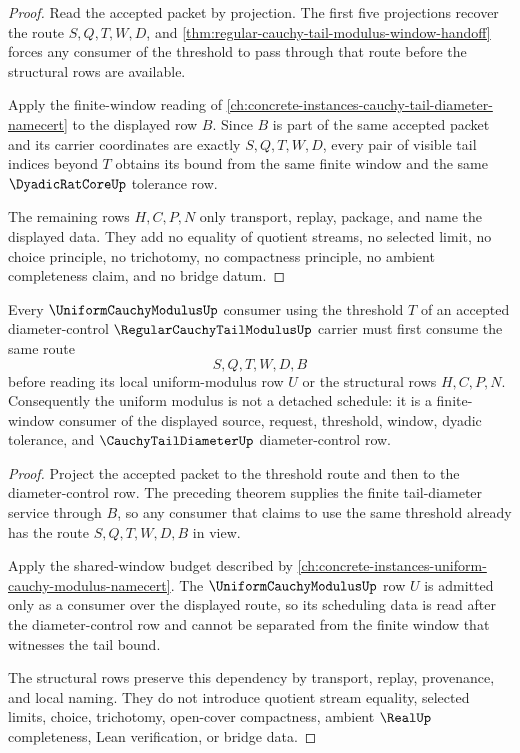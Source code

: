 \begin{proof}
Read the accepted packet by projection. The first five projections recover the route $S,Q,T,W,D$, and \autoref{thm:regular-cauchy-tail-modulus-window-handoff} forces any consumer of the threshold to pass through that route before the structural rows are available.

Apply the finite-window reading of \autoref{ch:concrete-instances-cauchy-tail-diameter-namecert} to the displayed row $B$. Since $B$ is part of the same accepted packet and its carrier coordinates are exactly $S,Q,T,W,D$, every pair of visible tail indices beyond $T$ obtains its bound from the same finite window and the same $\DyadicRatCoreUp$ tolerance row.

The remaining rows $H,C,P,N$ only transport, replay, package, and name the displayed data. They add no equality of quotient streams, no selected limit, no choice principle, no trichotomy, no compactness principle, no ambient completeness claim, and no bridge datum.
\end{proof}

\begin{theorem}
\label{thm:regular-cauchy-tail-modulus-uniform-window-consumption}
Every $\UniformCauchyModulusUp$ consumer using the threshold $T$ of an accepted diameter-control $\RegularCauchyTailModulusUp$ carrier must first consume the same route
$$
S,Q,T,W,D,B
$$
before reading its local uniform-modulus row $U$ or the structural rows $H,C,P,N$. Consequently the uniform modulus is not a detached schedule: it is a finite-window consumer of the displayed source, request, threshold, window, dyadic tolerance, and $\CauchyTailDiameterUp$ diameter-control row.
\end{theorem}

\begin{proof}
Project the accepted packet to the threshold route and then to the diameter-control row. The preceding theorem supplies the finite tail-diameter service through $B$, so any consumer that claims to use the same threshold already has the route $S,Q,T,W,D,B$ in view.

Apply the shared-window budget described by \autoref{ch:concrete-instances-uniform-cauchy-modulus-namecert}. The $\UniformCauchyModulusUp$ row $U$ is admitted only as a consumer over the displayed route, so its scheduling data is read after the diameter-control row and cannot be separated from the finite window that witnesses the tail bound.

The structural rows preserve this dependency by transport, replay, provenance, and local naming. They do not introduce quotient stream equality, selected limits, choice, trichotomy, open-cover compactness, ambient $\RealUp$ completeness, Lean verification, or bridge data.
\end{proof}

